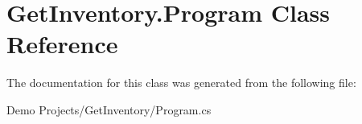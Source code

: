 \hypertarget{class_get_inventory_1_1_program}{\section{Get\-Inventory.\-Program Class Reference}
\label{class_get_inventory_1_1_program}
}


The documentation for this class was generated from the following file\-:\begin{DoxyCompactItemize}
\item 
Demo Projects/\-Get\-Inventory/Program.\-cs\end{DoxyCompactItemize}
